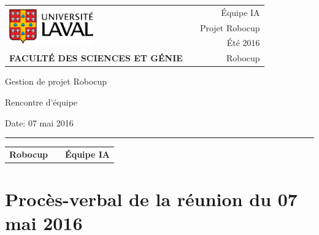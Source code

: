 \documentclass[12pt,letterpaper,twoside]{article}
\begin{document}
\setcounter{secnumdepth}{0}
\begin{titlepage}

        \vspace*{1cm}
        \begin{small}
        \begin{tabularx}{\textwidth}{ l X r }
        \multirow{3}{*}{\includegraphics[height=1.5cm,keepaspectratio]{ul_logo.pdf}}
        && \'Equipe IA\\
        && Projet Robocup\\
        && Été 2016\\

        \scriptsize{\textbf{FACULTÉ DES SCIENCES ET GÉNIE}} && Robocup
        \end{tabularx}
        \end{small}

        \vfill

        \begin{center}

        Gestion de projet Robocup

        \vspace{0.5cm}

        Rencontre d'\'equipe

        \vspace{2cm}

        \end{center}

        \vfill

        Date: 07 mai 2016

        \vspace{0.4cm}

        \rule{\textwidth}{2pt}

        \vspace{0.3cm}

        \begin{tabularx}{\textwidth}{ l X r }

        \textbf{Robocup} && \textbf{\'Equipe IA} \\

        \end{tabularx}


\end{titlepage}


\section*{Proc\`es-verbal de la réunion du 07 mai 2016}
\end{document}
